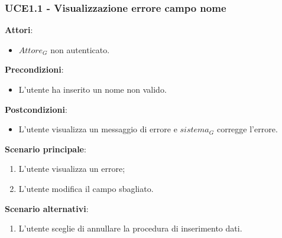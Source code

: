 \subsubsection{UCE1.1 - Visualizzazione errore campo nome}
\textbf{Attori}:
\begin{itemize}
    \item $\textit{Attore}_G$ non autenticato.
\end{itemize}
\textbf{Precondizioni}:
\begin{itemize}
    \item L'utente ha inserito un nome non valido.
\end{itemize}
\textbf{Postcondizioni}:
\begin{itemize}
    \item L'utente visualizza un messaggio di errore e $\textit{sistema}_G$ corregge l'errore.
\end{itemize}
\textbf{Scenario principale}:
\begin{enumerate}
    \item L'utente visualizza un errore;
    \item L'utente modifica il campo sbagliato.
\end{enumerate}
\textbf{Scenario alternativi}:
\begin{enumerate}
    \item L'utente sceglie di annullare la procedura di inserimento dati.
\end{enumerate}